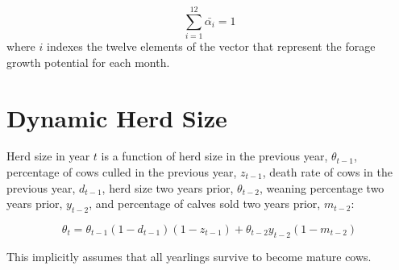 \documentclass[11pt]{article}
\begin{document}
\begin{equation}
\sum_{i=1}^{12} \bar{\alpha_{i}} = 1
\end{equation}
where $i$ indexes the twelve elements of the vector that represent the forage growth potential for each month.

\section{Dynamic Herd Size}
Herd size in year $t$ is a function of herd size in the previous year, $\theta_{t-1}$, percentage of cows culled in the previous year, $z_{t-1}$, death rate of cows in the previous year, $d_{t-1}$, herd size two years prior, $\theta_{t-2}$, weaning percentage two years prior, $y_{t-2}$, and percentage of calves sold two years prior, $m_{t-2}$:

\begin{equation}
\theta_t = \theta_{t-1} (1- d_{t-1}) (1 - z_{t-1}) + \theta_{t-2} y_{t-2} (1 - m_{t-2})
\end{equation} 

This implicitly assumes that all yearlings survive to become mature cows.
\end{document}
